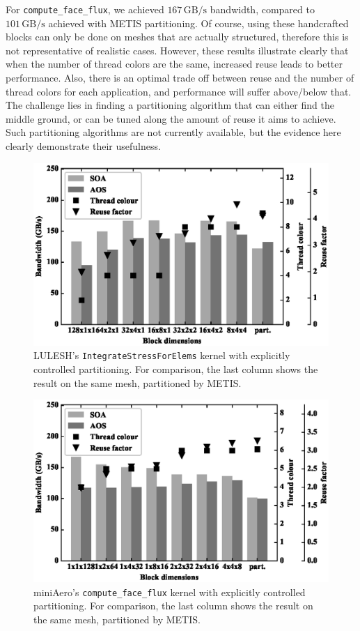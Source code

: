 For \texttt{compute\_face\_flux}, we achieved $167\,\text{GB/s}$ bandwidth,
compared to $101\,\text{GB/s}$ achieved with METIS partitioning. Of course, 
using these handcrafted blocks can only be done on meshes that are actually 
structured, therefore this is not representative of realistic cases. However, 
these results illustrate clearly that when the number of thread colors are the 
same, increased reuse leads to better performance. Also, there is an optimal 
trade off between reuse and the number of thread colors for each application, 
and performance will suffer above/below that. The challenge lies in finding a 
partitioning algorithm that can either find the middle ground, or can be tuned 
along the amount of reuse it aims to achieve. Such partitioning algorithms are 
not currently available, but the evidence here clearly demonstrate their 
usefulness. 


\begin{figure}[Htbp]
\centering
\includegraphics[width=12cm]{fig/lulesh_block.eps}
\caption{LULESH's \texttt{IntegrateStressForElems} kernel with explicitly 
controlled partitioning. For comparison, the last column shows the result on 
the same mesh, partitioned by METIS.} \label{fig:lulesh_block}
\end{figure}

\begin{figure}[Htbp]
\centering
\includegraphics[width=12cm]{fig/mini_aero_block.eps}
\caption{miniAero's \texttt{compute\_face\_flux} kernel with explicitly 
controlled partitioning. For comparison, the last column shows the result on 
the same mesh, partitioned by METIS.} \label{fig:mini_aero_block}
\end{figure}
